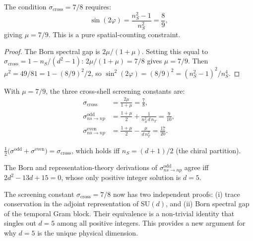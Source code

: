 \begin{remark}
\begin{theorem}
\label{thm:born_phase}
The condition $\sigma_\text{cross} = 7/8$ requires:
\begin{equation}
\boxed{\sin(2\varphi) = \frac{n_S^2-1}{n_S^2} = \frac{8}{9},}
\end{equation}
giving $\mu = 7/9$.  This is a pure spatial-counting constraint.
\end{theorem}
\begin{proof}
The Born spectral gap is $2\mu/(1\!+\!\mu)$.  Setting this equal to $\sigma_\text{cross} = 1 - n_S/(d^2\!-\!1)$: $2\mu/(1\!+\!\mu) = 7/8$ gives $\mu = 7/9$.  Then $\mu^2 = 49/81 = 1 - (8/9)^2/2$, so $\sin^2(2\varphi) = (8/9)^2 = (n_S^2\!-\!1)^2/n_S^4$.
\end{proof}

\begin{theorem}[Born--screening duality at $d=5$]
\label{thm:born_screening}
With $\mu = 7/9$, the three cross-shell screening constants are:
\begin{align}
\sigma_\text{cross} &= \frac{2\mu}{1+\mu} = \frac{7}{8}, \label{eq:born_cross}\\[3pt]
\sigma_{ns\to np}^\text{odd} &= \frac{1+\mu}{2} + \frac{1}{n_S^2\,d\,n_T} = \frac{9}{10}, \label{eq:born_odd}\\[3pt]
\sigma_{ns\to np}^\text{even} &= \frac{1+\mu}{2} - \frac{\mu}{d\,n_T^2} = \frac{17}{20}. \label{eq:born_even}
\end{align}
\end{theorem}

\begin{corollary}
$\frac{1}{2}\bigl(\sigma^\text{odd} + \sigma^\text{even}\bigr) = \sigma_\text{cross}$, which holds iff $n_S = (d+1)/2$ (the chiral partition).
\end{corollary}

\begin{theorem}[Uniqueness of $d=5$]
\label{thm:d5_born}
The Born and representation-theory derivations of $\sigma_{ns\to np}^\text{odd}$ agree iff $2d^2 - 13d + 15 = 0$, whose only positive integer solution is $\boxed{d = 5}$.
\end{theorem}

\begin{remark}
The screening constant $\sigma_\text{cross} = 7/8$ now has two independent proofs: (i) trace conservation in the adjoint representation of SU$(d)$, and (ii) Born spectral gap of the temporal Gram block.  Their equivalence is a non-trivial identity that singles out $d = 5$ among all positive integers.  This provides a new argument for why $d = 5$ is the unique physical dimension.
\end{remark}


\end{remark}
